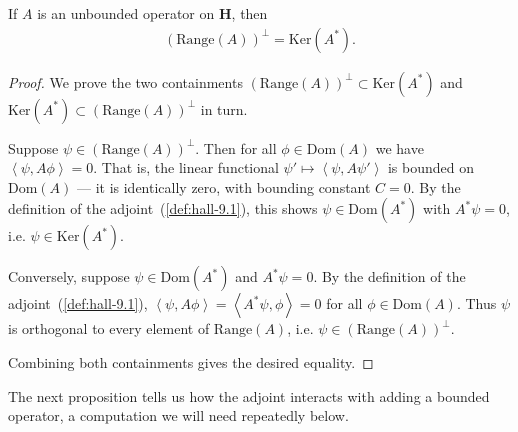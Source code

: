\begin{proposition}
    \label{prpstn:hall-9.12}
    \leanok
    If $A$ is an unbounded operator on $\mathbf{H}$, then
    \begin{align}
        \left( \text{Range}(A) \right)^\perp = \text{Ker}(A^*).
    \end{align}
\end{proposition}
\begin{proof}
    \leanok
We prove the two containments $\left( \text{Range}(A) \right)^\perp \subset \text{Ker}(A^*)$ and $\text{Ker}(A^*) \subset \left( \text{Range}(A) \right)^\perp$ in turn.

Suppose $\psi \in \left( \text{Range}(A) \right)^\perp$. Then for all $\phi \in \text{Dom}(A)$ we have $\left< \psi, A\phi \right> = 0$. That is, the linear functional $\psi' \mapsto \left< \psi, A\psi' \right>$ is bounded on $\text{Dom}(A)$ — it is identically zero, with bounding constant $C = 0$. By the definition of the adjoint~(\ref{def:hall-9.1}), this shows $\psi \in \text{Dom}(A^*)$ with $A^*\psi = 0$, i.e. $\psi \in \text{Ker}(A^*)$.

Conversely, suppose $\psi \in \text{Dom}(A^*)$ and $A^*\psi = 0$. By the definition of the adjoint~(\ref{def:hall-9.1}), $\left< \psi, A\phi \right> = \left< A^*\psi, \phi \right> = 0$ for all $\phi \in \text{Dom}(A)$. Thus $\psi$ is orthogonal to every element of $\text{Range}(A)$, i.e. $\psi \in \left( \text{Range}(A) \right)^\perp$.

Combining both containments gives the desired equality.
\end{proof}

The next proposition tells us how the adjoint interacts with adding a bounded operator, a computation we will need repeatedly below.

